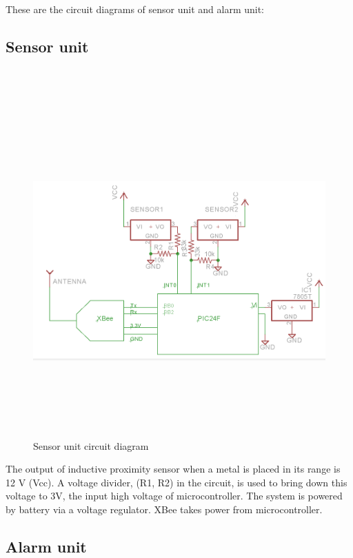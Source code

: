 \documentclass[aps,letterpaper,11pt]{article}
\begin{document}
These are the circuit diagrams of sensor unit and alarm unit:
\subsection{Sensor unit}
\mbox{} \\ \\
\begin{figure}[H]
\begin{center}
\includegraphics[height = 5in,width=7in,angle=00]{figures/sensorCircuit.png}
\caption{\small Sensor unit circuit diagram}
\end{center}
\end{figure}
The output of inductive proximity sensor when a metal is placed in its range is 12 V (Vcc). A voltage
divider, (R1, R2) in the circuit, is used to bring down this voltage to 3V, the input high voltage of
microcontroller. The system is powered by battery via a voltage regulator. XBee takes power from
microcontroller.\newpage
 \subsection{Alarm unit}
\mbox{} \\ \\ \\
\end{document}
